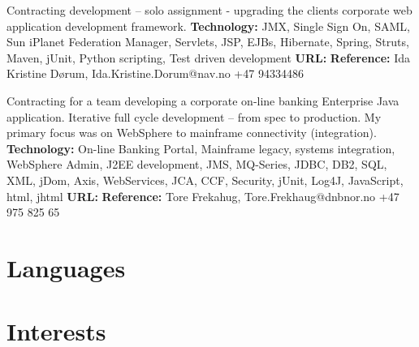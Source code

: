 \documentclass[11pt,a4paper,sans]{moderncv} %
\begin{document}
{
Contracting  development – solo assignment - upgrading the clients corporate web application development framework.
\newline{}\textbf{Technology:} JMX, Single Sign On, SAML, Sun iPlanet Federation Manager, Servlets, JSP, EJBs, Hibernate, Spring, Struts, Maven, jUnit, Python scripting, Test driven development
\newline{}\textbf{URL:} 
\newline{}\textbf{Reference:} Ida Kristine Dørum, Ida.Kristine.Dorum@nav.no +47 94334486
}

{
Contracting for a team  developing  a corporate on-line banking Enterprise Java application.
Iterative full cycle development – from spec to production. My primary	focus was on WebSphere to mainframe connectivity (integration).
\newline{}\textbf{Technology:} On-line Banking Portal, Mainframe legacy, systems integration, WebSphere Admin, J2EE development, JMS, MQ-Series, JDBC, DB2, SQL, XML, jDom, Axis, WebServices, JCA, CCF, Security, jUnit, Log4J, JavaScript, html, jhtml
\newline{}\textbf{URL:} 
\newline{}\textbf{Reference:} Tore Frekahug, Tore.Frekhaug@dnbnor.no +47 975 825 65
}

\section{Languages}

\section{Interests}
\end{document}
